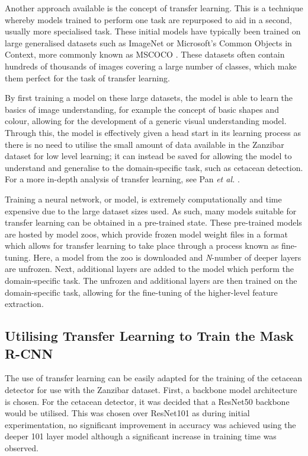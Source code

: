 Another approach available is the concept of transfer learning. This is a technique whereby models trained to perform one task are repurposed to aid in a second, usually more specialised task. These initial models have typically been trained on large generalised datasets such as ImageNet \cite{deng_imagenet:_2009} or Microsoft's Common Objects in Context, more commonly known as MSCOCO \cite{lin_microsoft_2014}. These datasets often contain hundreds of thousands of images covering a large number of classes, which make them perfect for the task of transfer learning. 

By first training a model on these large datasets, the model is able to learn the basics of image understanding, for example the concept of basic shapes and colour, allowing for the development of a generic visual understanding model. Through this, the model is effectively given a head start in its learning process as there is no need to utilise the small amount of data available in the Zanzibar dataset for low level learning; it can instead be saved for allowing the model to understand and generalise to the domain-specific task, such as cetacean detection. For a more in-depth analysis of transfer learning, see Pan \textit{et al.} \cite{pan_survey_2010}.

Training a neural network, or model, is extremely computationally and time expensive due to the large dataset sizes used. As such, many models suitable for transfer learning can be obtained in a pre-trained state. These pre-trained models are hosted by model zoos, which provide frozen model weight files in a format which allows for transfer learning to take place through a process known as fine-tuning. Here, a model from the zoo is downloaded and \textit{N}-number of deeper layers are unfrozen. Next, additional layers are added to the model which perform the domain-specific task. The unfrozen and additional layers are then trained on the domain-specific task, allowing for the fine-tuning of the higher-level feature extraction. 

\subsection{Utilising Transfer Learning to Train the Mask R-CNN}\label{ch:cetDet,sec:initialTesting,sub:transferLearningforTheDetector}

The use of transfer learning can be easily adapted for the training of the cetacean detector for use with the Zanzibar dataset. First, a backbone model architecture is chosen. For the cetacean detector, it was decided that a ResNet50 \cite{he_deep_2015} backbone would be utilised. This was chosen over ResNet101 as during initial experimentation, no significant improvement in accuracy was achieved using the deeper 101 layer model although a significant increase in training time was observed.

